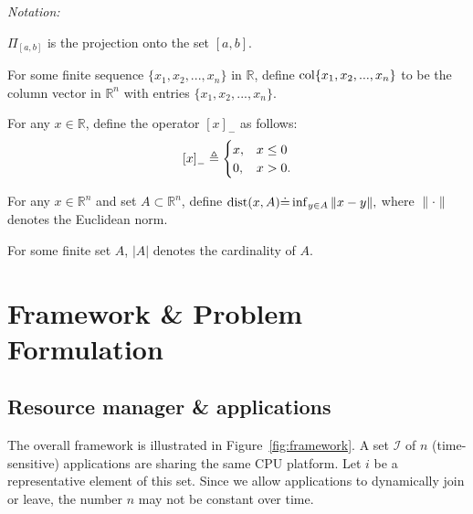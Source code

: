 \documentclass[letter,11pt]{article}
\begin{document}
\textit{Notation:} 
\begin{itemize}
{\item[$\bullet$]} $\Pi_{[a,b]}$ is the projection onto the set $[a,b]$.
{\item[$\bullet$]} For some finite sequence $\{x_1,x_2,...,x_n\}$ in $\mathbb{R}$,
  define ${\rm col}\{x_1,x_2,...,x_n\}$ to be the column vector in $\mathbb{R}^{n}$ with entries $\{x_1,x_2,...,x_n\}$.
{\item[$\bullet$]} For any $x\in\mathbb{R}$, define the operator ${\left[{x}\right]_{-}}$ as follows:
\begin{equation*}
{\left[{x}\right]_{-}} \triangleq \begin{cases}
x, & x\leq{0} \cr
0, & x > {0}.
\end{cases}
\end{equation*}
{\item[$\bullet$]} For any $x\in\mathbb{R}^{n}$ and set $A\subset{\mathbb{R}^{n}}$, define ${\rm dist}(x,A){\doteq}\inf_{y\in{A}}\|x-y\|,$ where $\|\cdot\|$ denotes the Euclidean norm.
{\item[$\bullet$]} For some finite set $A$, ${\left\vert {A} \right\vert}$ denotes the cardinality of $A$.
\end{itemize}

\section{Framework \& Problem Formulation} 
\label{sec:framework}

\subsection{Resource manager \& applications}
\label{sec:RMapp}

The overall framework is illustrated in Figure~\ref{fig:framework}. A
set $\mathcal{I}$ of $n$ (time-sensitive) applications are sharing the same CPU platform. Let $i$ be a representative element of this set. Since we allow applications to dynamically join or leave, the number $n$ may not be constant over time. 
\end{document}
